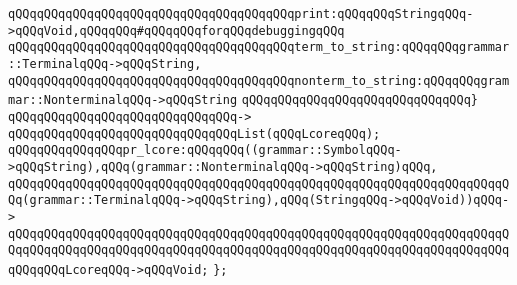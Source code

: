 \verb|qQQqqQQqqQQqqQQqqQQqqQQqqQQqqQQqqQQqqQQqprint:qQQqqQQqStringqQQq->qQQqVoid,qQQqqQQq#qQQqqQQqforqQQqdebuggingqQQq|\newline
\verb|qQQqqQQqqQQqqQQqqQQqqQQqqQQqqQQqqQQqqQQqterm_to_string:qQQqqQQqgrammar::TerminalqQQq->qQQqString,|\newline
\verb|qQQqqQQqqQQqqQQqqQQqqQQqqQQqqQQqqQQqqQQqnonterm_to_string:qQQqqQQqgrammar::NonterminalqQQq->qQQqString|\newline
\verb|qQQqqQQqqQQqqQQqqQQqqQQqqQQqqQQq}|\newline
\verb|qQQqqQQqqQQqqQQqqQQqqQQqqQQqqQQq->|\newline
\verb|qQQqqQQqqQQqqQQqqQQqqQQqqQQqqQQqList(qQQqLcoreqQQq);|\newline
\newline
\verb|qQQqqQQqqQQqqQQqpr_lcore:qQQqqQQq((grammar::SymbolqQQq->qQQqString),qQQq(grammar::NonterminalqQQq->qQQqString)qQQq,|\newline
\verb|qQQqqQQqqQQqqQQqqQQqqQQqqQQqqQQqqQQqqQQqqQQqqQQqqQQqqQQqqQQqqQQqqQQqqQQq(grammar::TerminalqQQq->qQQqString),qQQq(StringqQQq->qQQqVoid))qQQq->|\newline
\verb|qQQqqQQqqQQqqQQqqQQqqQQqqQQqqQQqqQQqqQQqqQQqqQQqqQQqqQQqqQQqqQQqqQQqqQQqqQQqqQQqqQQqqQQqqQQqqQQqqQQqqQQqqQQqqQQqqQQqqQQqqQQqqQQqqQQqqQQqqQQqqQQqqQQqLcoreqQQq->qQQqVoid;|\newline
\verb|};|\newline

